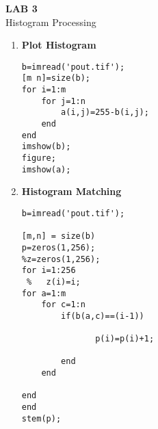 \documentclass[12pt,a4paper]{report}
\begin{document}
\begin{enumerate}
\end{enumerate}
\pagebreak\begin{center}
\Huge\textbf{LAB 3}\\
\large{Histogram Processing
}
\end{center}
\vspace{1.0cm}
\begin{enumerate}
\item\textbf{Plot Histogram
}
\begin{verbatim}
b=imread('pout.tif');
[m n]=size(b);
for i=1:m
    for j=1:n
        a(i,j)=255-b(i,j);
    end
end
imshow(b);
figure;
imshow(a);
\end{verbatim}\vspace{0.5cm}
\item\textbf{Histogram Matching
}
\begin{verbatim}
b=imread('pout.tif');

[m,n] = size(b)
p=zeros(1,256);
%z=zeros(1,256);
for i=1:256
 %   z(i)=i;
for a=1:m
    for c=1:n
        if(b(a,c)==(i-1))
                
               p(i)=p(i)+1;
                
        end
    end
    
end
end
stem(p);\end{verbatim}\vspace{0.5cm}

\end{enumerate}
\pagebreak
\end{document}

